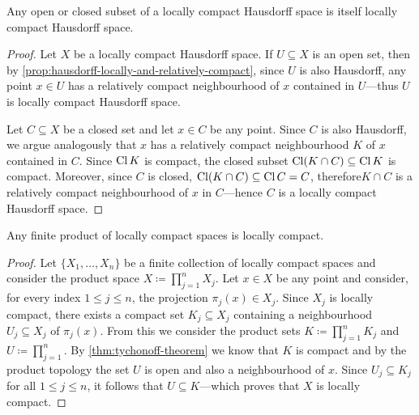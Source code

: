 \begin{proposition}
    \label{prop:subset-loc-cpct-hausdorff}
    Any open or closed subset of a locally compact Hausdorff space is itself locally
    compact Hausdorff space.
\end{proposition}

\begin{proof}
    Let \(X\) be a locally compact Hausdorff space. If \(U \subseteq X\) is an open
    set, then by \cref{prop:hausdorff-locally-and-relatively-compact}, since \(U\)
    is also Hausdorff, any point \(x \in U\) has a relatively compact neighbourhood
    of \(x\) contained in \(U\)---thus \(U\) is locally compact Hausdorff space.

    Let \(C \subseteq X\) be a closed set and let \(x \in C\) be any point. Since
    \(C\) is also Hausdorff, we argue analogously that \(x\) has a relatively
    compact neighbourhood \(K\) of \(x\) contained in \(C\). Since \(\operatorname{Cl} K\) is
    compact, the closed subset \(\operatorname{Cl}(K \cap C) \subseteq \operatorname{Cl} K\) is
    compact. Moreover, since \(C\) is closed, \(\operatorname{Cl}(K \cap C) \subseteq \operatorname{Cl} C = C\),
    therefore\(K \cap C\) is a relatively compact neighbourhood of \(x\) in
    \(C\)---hence \(C\) is a locally compact Hausdorff space.
\end{proof}

\begin{lemma}
    \label{lem:product-loc-cpct}
    Any finite product of locally compact spaces is locally compact.
\end{lemma}

\begin{proof}
    Let \(\{X_1, \dots, X_n\}\) be a finite collection of locally compact spaces and
    consider the product space \(X \coloneq \prod_{j=1}^n X_j\). Let \(x \in X\) be
    any point and consider, for every index \(1 \leq j \leq n\), the projection
    \(\pi_j(x) \in X_j\). Since \(X_j\) is locally compact, there exists a compact
    set \(K_j \subseteq X_j\) containing a neighbourhood \(U_j \subseteq X_j\) of
    \(\pi_j(x)\). From this we consider the product sets
    \(K \coloneq \prod_{j=1}^n K_j\) and \(U \coloneq \prod_{j=1}^n\). By
    \cref{thm:tychonoff-theorem} we know that \(K\) is compact and by the product
    topology the set \(U\) is open and also a neighbourhood of \(x\). Since
    \(U_j \subseteq K_j\) for all \(1 \leq j \leq n\), it follows that
    \(U \subseteq K\)---which proves that \(X\) is locally compact.
\end{proof}

